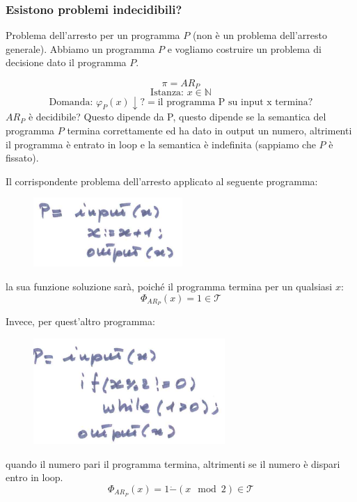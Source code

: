 \documentclass{article}
\begin{document}
\subsubsection{Esistono problemi indecidibili?}
Problema dell'arresto per un programma $P$ (non è un problema dell'arresto generale).
Abbiamo un programma $P$ e vogliamo costruire un problema di decisione dato
il programma $P$.

$$\pi=AR_P$$
$$\text{Istanza: }x\in\mathbb{N}$$
$$\text{Domanda: }\varphi_P(x)\downarrow?=\text{il programma P su input x termina?}$$
$AR_P$ è decidibile? Questo dipende da P, questo dipende se la semantica del programma
$P$ termina correttamente ed ha dato in output un numero, altrimenti il programma
è entrato in loop e la semantica è indefinita (sappiamo che $P$ è fissato).

Il corrispondente problema dell'arresto applicato al seguente programma:
\begin{figure}[H]
    \centering
    \includegraphics[scale=0.5]{images/programma_Pincr.png}
\end{figure}
la sua funzione soluzione sarà, poiché il programma termina per un qualsiasi $x$:
$$\Phi_{AR_P}(x)=1\in\mathcal{T}$$

Invece, per quest'altro programma:
\begin{figure}[H]
    \centering
    \includegraphics[scale=0.5]{images/programma_P_pari.png}
\end{figure}
quando il numero pari il programma termina, altrimenti se il numero è dispari
entro in loop.
$$\Phi_{AR_P}(x)=1\dot{-}(x \mod{2})\in\mathcal{T}$$
\end{document}
